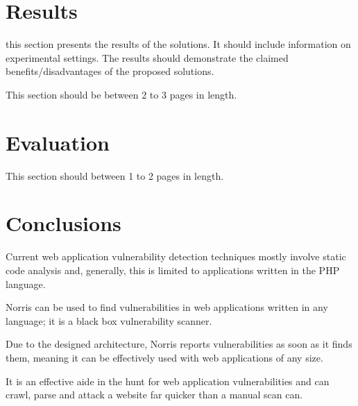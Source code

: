 \documentclass[12pt,a4paper]{article}
\begin{document}
\section{Results}

this section presents the results of the solutions.  It should include information on experimental settings.  The results should demonstrate the claimed benefits/disadvantages of the proposed solutions.

This section should be between 2 to 3 pages in length.

\section{Evaluation}

This section should between 1 to 2 pages in length.

\section{Conclusions}

Current web application vulnerability detection techniques mostly involve static code analysis and, generally, this is limited to applications written in the PHP language.

Norris can be used to find vulnerabilities in web applications written in any language; it is a black box vulnerability scanner. 

Due to the designed architecture, Norris reports vulnerabilities as soon as it finds them, meaning it can be effectively used with web applications of any size.

It is an effective aide in the hunt for web application vulnerabilities and can crawl, parse and attack a website far quicker than a manual scan can.


\end{document}
